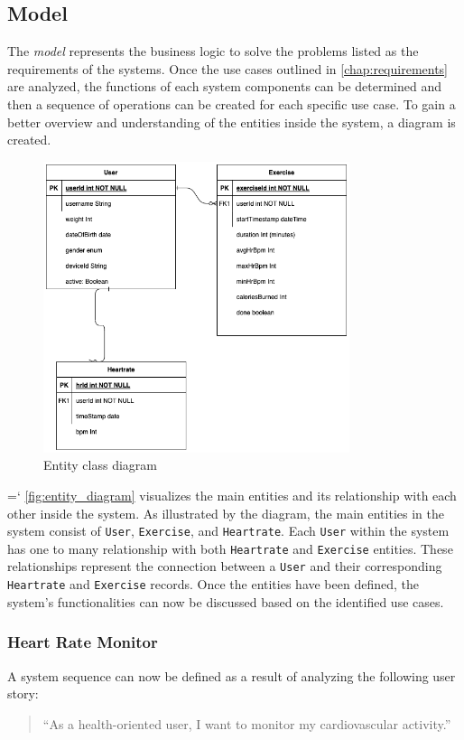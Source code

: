 \subsection{Model}
\label{chap:model_design}
The \emph{model} represents the business logic to solve the problems listed as the requirements of the systems. Once the use cases outlined in \autoref{chap:requirements} are analyzed, the functions of each system components can be determined and then a sequence of operations can be created for each specific use case.
To gain a better overview and understanding of the entities inside the system, a diagram is created.
\begin{figure}[H]
    \centering
    \includegraphics[width=0.8\textwidth]{diagrams/ham-entity.drawio.png}
    \caption{Entity class diagram}
    \label{fig:entity_diagram}
\end{figure}
{{\ttfamily \hyphenchar\the\font=`\-}
\autoref{fig:entity_diagram} visualizes the main entities and its relationship with each other inside the system. As illustrated by the diagram, the main entities in the system consist of \texttt{User}, \texttt{Exercise}, and \texttt{Heartrate}. 
Each \texttt{User} within the system has one to many relationship with both \texttt{Heartrate} and \texttt{Exercise} entities. These relationships represent the connection between a \texttt{User} and their corresponding \texttt{Heartrate} and \texttt{Exercise} records. 
Once the entities have been defined, the system's functionalities can now be discussed based on the identified use cases.
\par}


\subsubsection{Heart Rate Monitor}
\label{chap:hr_monitor_design}
A system sequence can now be defined as a result of analyzing the following user story:
\begin{quotation}
    \enquote{As a health-oriented user, I want to monitor my cardiovascular activity.} 
\end{quotation}

